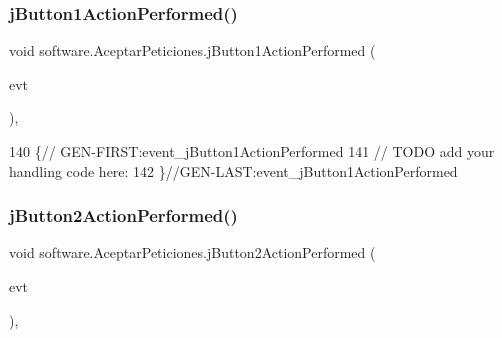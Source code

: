 \mbox{\label{classsoftware_1_1_aceptar_peticiones_ad0a52e08d96fc121660bf6c65ee56b88}} 
\subsubsection{\texorpdfstring{j\+Button1\+Action\+Performed()}{jButton1ActionPerformed()}}
{\footnotesize\ttfamily void software.\+Aceptar\+Peticiones.\+j\+Button1\+Action\+Performed (\begin{DoxyParamCaption}\item[{java.\+awt.\+event.\+Action\+Event}]{evt }\end{DoxyParamCaption})\hspace{0.3cm}{\ttfamily [inline]}, {\ttfamily [private]}}


\begin{DoxyCode}
140                                                                          \{\textcolor{comment}{//
      GEN-FIRST:event\_jButton1ActionPerformed}
141         \textcolor{comment}{// TODO add your handling code here:}
142     \}\textcolor{comment}{//GEN-LAST:event\_jButton1ActionPerformed}
\end{DoxyCode}
\mbox{\label{classsoftware_1_1_aceptar_peticiones_aee913c83480bd79452ad78c860ee2dba}} 
\subsubsection{\texorpdfstring{j\+Button2\+Action\+Performed()}{jButton2ActionPerformed()}}
{\footnotesize\ttfamily void software.\+Aceptar\+Peticiones.\+j\+Button2\+Action\+Performed (\begin{DoxyParamCaption}\item[{java.\+awt.\+event.\+Action\+Event}]{evt }\end{DoxyParamCaption})\hspace{0.3cm}{\ttfamily [inline]}, {\ttfamily [private]}}


